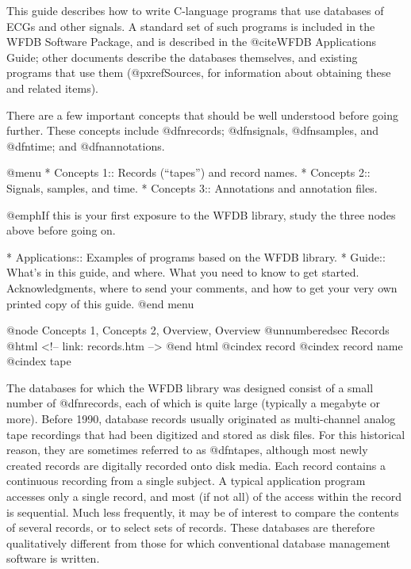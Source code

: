 This guide describes how to write C-language programs that use databases
of ECGs and other signals.  A standard set of such programs is included
in the WFDB Software Package, and is described in the @cite{WFDB
Applications Guide}; other documents describe the databases themselves,
and existing programs that use them (@pxref{Sources}, for information
about obtaining these and related items).

There are a few important concepts that should be well understood before
going further.  These concepts include @dfn{records}; @dfn{signals},
@dfn{samples}, and @dfn{time}; and @dfn{annotations}.

@menu
* Concepts 1::			Records (``tapes'') and record names.
* Concepts 2::			Signals, samples, and time.
* Concepts 3::			Annotations and annotation files.

@emph{If this is your first exposure to the WFDB library,
study the three nodes above before going on.}

* Applications::		Examples of programs based on the WFDB library.
* Guide::			What's in this guide, and where.
                		What you need to know to get started.
				Acknowledgments, where to send your
				comments, and how to get your very own
				printed copy of this guide.
@end menu

@node     Concepts 1, Concepts 2, Overview, Overview
@unnumberedsec Records
@html
<!-- link: records.htm -->
@end html
@cindex record
@cindex record name
@cindex tape

The databases for which the WFDB library was designed consist of a
small number of @dfn{records}, each of which is quite large (typically
a megabyte or more).  Before 1990, database records usually originated
as multi-channel analog tape recordings that had been digitized and
stored as disk files.  For this historical reason, they are sometimes
referred to as @dfn{tapes}, although most newly created records are
digitally recorded onto disk media.  Each record contains a continuous
recording from a single subject.  A typical application program
accesses only a single record, and most (if not all) of the access
within the record is sequential.  Much less frequently, it may be of
interest to compare the contents of several records, or to select sets
of records.  These databases are therefore qualitatively different
from those for which conventional database management software is
written.

